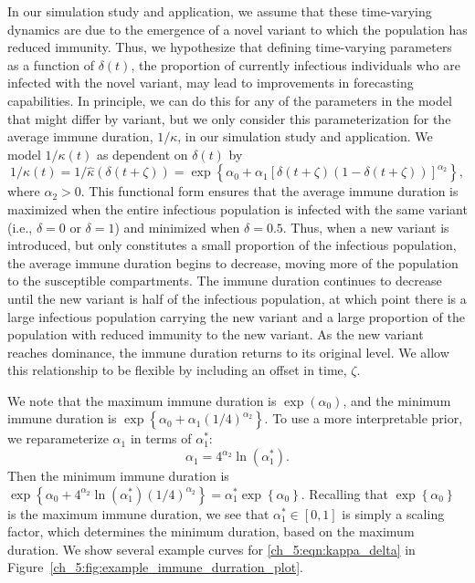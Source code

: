 In our simulation study and application, we assume that these time-varying dynamics are due to the emergence of a novel variant to which the population has reduced immunity.
Thus, we hypothesize that defining time-varying parameters as a function of \( \delta(t) \), the proportion of currently infectious individuals who are infected with the novel variant, may lead to improvements in forecasting capabilities.
In principle, we can do this for any of the parameters in the model that might differ by variant, but we only consider this parameterization for the average immune duration, \( 1 / \kappa \), in our simulation study and application.
We model \( 1 / \kappa(t) \) as dependent on \( \delta(t) \) by
\begin{equation}
    1 / \kappa(t) = 1 / \hat{\kappa}\left( \delta (t + \zeta) \right) = \exp \left\{ \alpha_0 + \alpha_1 \left[ \delta(t + \zeta) \left( 1 - \delta(t + \zeta) \right) \right]^{\alpha_2} \right\},
    \label{ch_5:eqn:kappa_delta}
\end{equation}
where \( \alpha_2 > 0 \).
This functional form ensures that the average immune duration is maximized when the entire infectious population is infected with the same variant (i.e., \( \delta = 0 \) or \( \delta = 1 \)) and minimized when \( \delta = 0.5 \).
Thus, when a new variant is introduced, but only constitutes a small proportion of the infectious population, the average immune duration begins to decrease, moving more of the population to the susceptible compartments.
The immune duration continues to decrease until the new variant is half of the infectious population, at which point there is a large infectious population carrying the new variant and a large proportion of the population with reduced immunity to the new variant.
As the new variant reaches dominance, the immune duration returns to its original level.
We allow this relationship to be flexible by including an offset in time, \( \zeta \).

We note that the maximum immune duration is \( \exp \left( \alpha_0 \right)\), and the minimum immune duration is \(\exp \left\{ \alpha_0 + \alpha_1 \left( 1/4  \right)^{\alpha_2} \right\} \).
To use a more interpretable prior, we reparameterize \( \alpha_1 \) in terms of \( \alpha_1^* \):
\begin{equation}
    \alpha_1 = 4^{\alpha_2} \ln \left( \alpha_1^* \right).
    \label{ch_5:eqn:alpha_1}
\end{equation}
Then the minimum immune duration is 
\( \exp \left\{ \alpha_0 + 4^{\alpha_2} \ln \left( \alpha_1^* \right) \left( 1/4  \right)^{\alpha_2} \right\} = \alpha_1^* \exp \left\{ \alpha_0 \right\} \).
Recalling that \( \exp \left\{ \alpha_0 \right\} \) is the maximum immune duration, we see that  \( \alpha_1^* \in [0,1] \) is simply a scaling factor, which determines the minimum duration, based on the maximum duration.
We show several example curves for \eqref{ch_5:eqn:kappa_delta} in Figure~\ref{ch_5:fig:example_immune_durration_plot}.

